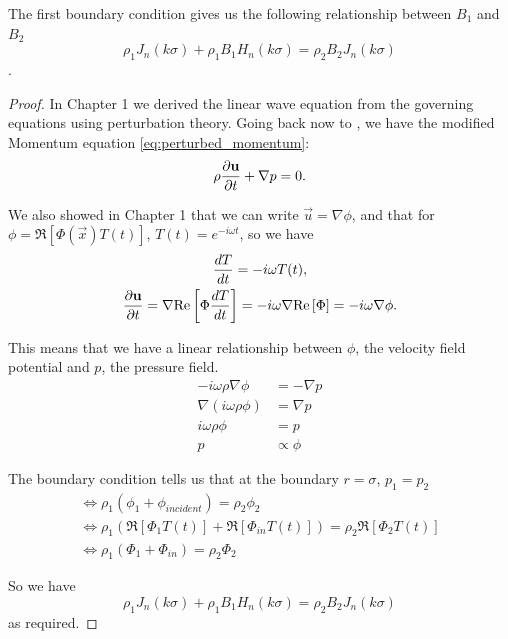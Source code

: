 \begin{propn} The first boundary condition gives us the following relationship between $B_1$ and $B_2$
  \[ \rho_1 J_n(k\sigma) + \rho_1 B_1 H_n(k\sigma) = \rho_2 B_2 J_n (k\sigma) \].
\end{propn}
\begin{proof}
  In Chapter 1 we derived the linear wave equation from the governing equations using perturbation theory. Going back now to , we have the modified Momentum equation \eqref{eq:perturbed_momentum}:
  \begin{equation*}
    \rho \frac{\partial \mathbf{u}}{\partial t} + \nabla p = 0.
  \end{equation*}

  We also showed in Chapter 1 that we can write $\vec{u} = \nabla \phi$, and that for $\phi = \Re[\Phi(\vec{x})T(t)]$, $T(t)=e^{-i\omega t}$, so we have
  \begin{gather*}
    \frac{dT}{dt} = - i\omega T(t), \\
    \frac{\partial \mathbf{u}}{\partial t} = \nabla \text{Re}\left[\Phi \frac{dT}{dt} \right]
    = -i \omega \nabla \text{Re}\left[ \Phi \right] = -i \omega \nabla \phi.
  \end{gather*}

  This means that we have a linear relationship between $\phi$, the velocity field potential and $p$, the pressure field.
  \begin{align*}
    -i \omega \rho \nabla \phi &= - \nabla p \\
    \nabla (i \omega \rho \phi) &= \nabla p \\
    i \omega \rho \phi &= p \\
    p &\propto \phi
  \end{align*}

  The boundary condition tells us that at the boundary $r=\sigma$, $p_1 = p_2$
  \begin{gather*}
    \Leftrightarrow \rho_1 \left(\phi_{1} + \phi_{incident} \right) = \rho_2 \phi_{2} \\
    \Leftrightarrow \rho_1 \left(\Re[ \Phi_1 T(t) ]  + \Re[\Phi_{in}T(t)] \right) = \rho_2 \Re[\Phi_{2}T(t)]\\
    \Leftrightarrow \rho_1 \left(\Phi_1  + \Phi_{in} \right) = \rho_2 \Phi_{2}
  \end{gather*}

  So we have
  \[ \rho_1 J_n(k\sigma) + \rho_1 B_1 H_n(k\sigma) = \rho_2 B_2 J_n (k\sigma) \]
  as required.
\end{proof}

